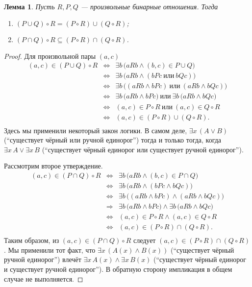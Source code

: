 \documentclass[12pt,notitlepage]{article}
\theoremstyle{plain}
\newtheorem{lemma}[thm]{Лемма}
\theoremstyle{definition}
\theoremstyle{plain}
\newcommand{\sbs}{\subseteq}
\newcommand{\1}{\mathbf{1}}
\newcommand{\0}{\mathbf{0}}
\newcommand{\ply}{\Longrightarrow}
\begin{document}
\begin{lemma}\label{ch0:ex11}
	Пусть $R, P, Q $ --- произвольные бинарные отношения. Тогда
	\begin{enumerate}
		\item $(P \cup Q) \circ R = (P \circ R) \cup (Q \circ R)$;
		\item $(P \cap Q) \circ R \sbs (P \circ R) \cap (Q \circ R)$.
	\end{enumerate}
\end{lemma}
\begin{proof}
	Для произвольной пары $(a,c)$
	$$
	\begin{array}{rcl}
		(a, c) \in (P \cup Q) \circ R &\iff& \exists b\, \bigl( a R b \wedge (b,c) \in P \cup Q \bigr)\\
		&\iff& \exists b\, \bigl( a R b \wedge ( b P c\ \mbox{или}\ b Q c) \bigr)\\
		&\iff& \exists b\, \bigl( (a R b \wedge  b P c)\ \mbox{или}\ (a R b \wedge b Q c) \bigr)\\
		&\iff& \exists b\, \bigl( a R b \wedge  b P c \bigl)\ \mbox{или}\ \exists b\, \bigl(a R b \wedge b Q c \bigr)\\
		&\iff& (a,c) \in P \circ R\ \mbox{или}\ (a,c) \in Q \circ R\\
		&\iff& (a,c) \in (P \circ R) \cup (Q \circ R).\\
	\end{array}
	$$
	Здесь мы применили некоторый закон логики. В самом деле, $\exists x\, (A \vee B)$ (``существует чёрный или ручной единорог'') тогда и только тогда, когда $\exists x\, A \vee \exists x\, B$ (``существует чёрный единорог или существует ручной единорог'').
	
	Рассмотрим второе утверждение.
	$$
	\begin{array}{rcl}
		(a, c) \in (P \cap Q) \circ R &\iff& \exists b\, \bigl( a R b \wedge (b,c) \in P \cap Q \bigr)\\
		&\iff& \exists b\, \bigl( a R b \wedge ( b P c \wedge b Q c) \bigr)\\
		&\iff& \exists b\, \bigl( (a R b \wedge  b P c) \wedge (a R b \wedge b Q c) \bigr)\\
		&\ply& \exists b\, \bigl( a R b \wedge  b P c \bigl) \wedge \exists b\, \bigl(a R b \wedge b Q c \bigr)\\
		&\iff& (a,c) \in P \circ R \wedge (a,c) \in Q \circ R\\
		&\iff& (a,c) \in (P \circ R) \cap (Q \circ R).\\
	\end{array}
	$$
	Таким образом, из $(a,c) \in (P \cap Q) \circ R$ следует $(a,c) \in (P \circ R) \cap (Q \circ R)$. Мы применили тот факт, что $\exists x\, (A(x) \wedge B(x))$ (``существует чёрный ручной единорог'') влечёт $\exists x\, A(x) \wedge \exists x\, B(x)$ (``существует чёрный единорог и существует ручной единорог''). В обратную сторону импликация в общем случае не выполняется.
\end{proof}
\end{document}
